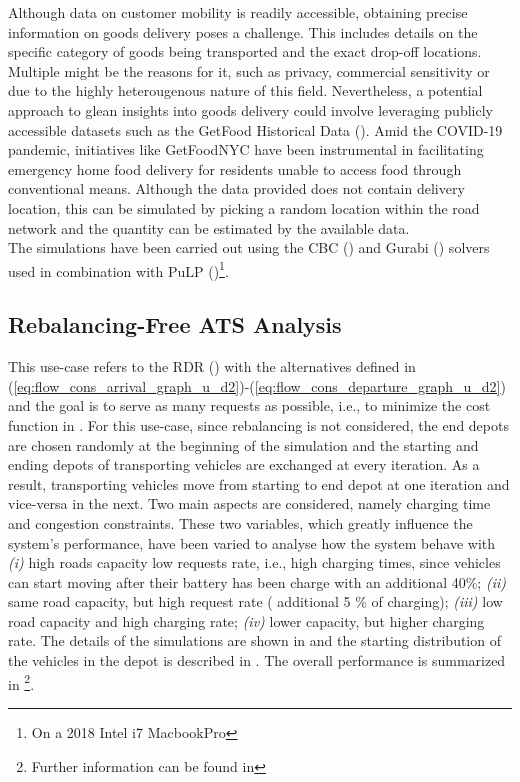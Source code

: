 Although data on customer mobility is readily accessible, obtaining precise information on goods delivery poses a challenge. This includes details on the specific category of goods being transported and the exact drop-off locations. Multiple might be the reasons for it, such as privacy, commercial sensitivity or due to the highly heterougenous nature of this field. Nevertheless, a potential approach to glean insights into goods delivery could involve leveraging publicly accessible datasets such as the GetFood Historical Data (\cite{getfoodnyc}). Amid the COVID-19 pandemic, initiatives like GetFoodNYC have been instrumental in facilitating emergency home food delivery for residents unable to access food through conventional means. Although the data provided does not contain delivery location, this can be simulated by picking a random location within the road network and the quantity can be estimated by the available data.\\
The simulations have been carried out using the CBC (\cite{schumacher2022rcbc}) and Gurabi (\cite{gurobi}) solvers used in combination with PuLP (\cite{dunning2011pulp})\footnote{On a 2018 Intel i7 MacbookPro}. 


\subsection{Rebalancing-Free ATS Analysis}
This use-case refers to the RDR () with the alternatives defined in (\ref{eq:flow_cons_arrival_graph_u_d2})-(\ref{eq:flow_cons_departure_graph_u_d2}) and the goal is to serve as many requests as possible, i.e., to minimize the cost function in . For this use-case, since rebalancing is not considered, the end depots are chosen randomly at the beginning of the simulation and the starting and ending depots of transporting vehicles are exchanged at every iteration. As a result, transporting vehicles move from starting to end depot at one iteration and vice-versa in the next. Two main aspects are considered, namely charging time and congestion constraints. These two variables, which greatly influence the system's performance, have been varied to analyse how the system behave with \textit{(i)} high roads capacity low requests rate, i.e., high charging times, since vehicles can start moving after their battery has been charge with an additional 40\%; \textit{(ii)} same road capacity, but high request rate ( additional 5 \% of charging); \textit{(iii)} low road capacity and high charging rate; \textit{(iv)} lower capacity, but higher charging rate. 
 The details of the simulations are shown in  and the starting distribution of the vehicles in the depot is described in . The overall performance is summarized in \footnote{Further information can be found in 
 }. \\




